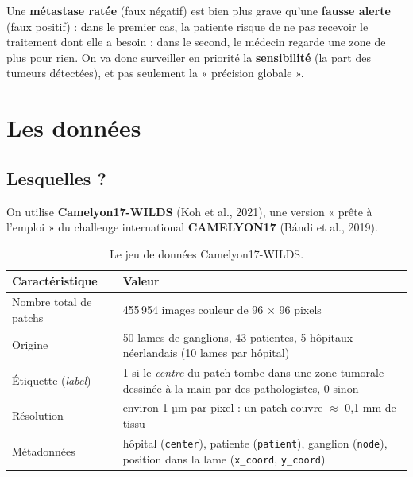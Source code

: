 \documentclass[11pt,a4paper]{article}
\begin{document}
\begin{attention}
Une \textbf{métastase ratée} (faux négatif) est bien plus grave qu'une \textbf{fausse alerte} (faux
positif) : dans le premier cas, la patiente risque de ne pas recevoir le traitement dont elle a besoin ;
dans le second, le médecin regarde une zone de plus pour rien. On va donc surveiller en priorité la
\textbf{sensibilité} (la part des tumeurs détectées), et pas seulement la « précision globale ».
\end{attention}

\section{Les données}

\subsection{Lesquelles ?}
On utilise \textbf{Camelyon17-WILDS} (Koh et al., 2021), une version « prête à l'emploi » du challenge
international \textbf{CAMELYON17} (Bándi et al., 2019).

\begin{table}[H]
\centering
\begin{tabularx}{\textwidth}{lX}
\toprule
\textbf{Caractéristique} & \textbf{Valeur} \\
\midrule
Nombre total de patchs & 455\,954 images couleur de 96 × 96 pixels \\
Origine & 50 lames de ganglions, 43 patientes, 5 hôpitaux néerlandais (10 lames par hôpital) \\
Étiquette (\emph{label}) & 1 si le \emph{centre} du patch tombe dans une zone tumorale dessinée à la main par
des pathologistes, 0 sinon \\
Résolution & environ 1 µm par pixel : un patch couvre $\approx$ 0,1 mm de tissu \\
Métadonnées & hôpital (\texttt{center}), patiente (\texttt{patient}), ganglion (\texttt{node}),
position dans la lame (\texttt{x\_coord}, \texttt{y\_coord}) \\
\bottomrule
\end{tabularx}
\caption{Le jeu de données Camelyon17-WILDS.}
\end{table}
\end{document}
